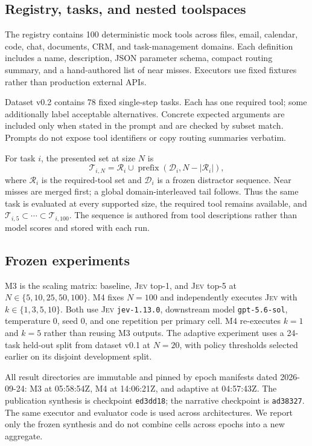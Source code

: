 \documentclass[10pt,twocolumn]{article}
\newcommand{\jev}{\textsc{Jev}}
\begin{document}
\subsection{Registry, tasks, and nested toolspaces}

The registry contains 100 deterministic mock tools across files, email, calendar, code, chat, documents, CRM, and task-management domains. Each definition includes a name, description, JSON parameter schema, compact routing summary, and a hand-authored list of near misses. Executors use fixed fixtures rather than production external APIs.

Dataset v0.2 contains 78 fixed single-step tasks. Each has one required tool; some additionally label acceptable alternatives. Concrete expected arguments are included only when stated in the prompt and are checked by subset match. Prompts do not expose tool identifiers or copy routing summaries verbatim.

For task $i$, the presented set at size $N$ is
\begin{equation}
\mathcal{T}_{i,N}=\mathcal{R}_i \cup
\operatorname{prefix}(\mathcal{D}_i,N-|\mathcal{R}_i|),
\end{equation}
where $\mathcal{R}_i$ is the required-tool set and $\mathcal{D}_i$ is a frozen distractor sequence. Near misses are merged first; a global domain-interleaved tail follows. Thus the same task is evaluated at every supported size, the required tool remains available, and $\mathcal{T}_{i,5}\subset\cdots\subset\mathcal{T}_{i,100}$. The sequence is authored from tool descriptions rather than model scores and stored with each run.

\subsection{Frozen experiments}

M3 is the scaling matrix: baseline, \jev{} top-1, and \jev{} top-5 at $N\in\{5,10,25,50,100\}$. M4 fixes $N=100$ and independently executes \jev{} with $k\in\{1,3,5,10\}$. Both use \jev{} \texttt{jev-1.13.0}, downstream model \texttt{gpt-5.6-sol}, temperature 0, seed 0, and one repetition per primary cell. M4 re-executes $k=1$ and $k=5$ rather than reusing M3 outputs. The adaptive experiment uses a 24-task held-out split from dataset v0.1 at $N=20$, with policy thresholds selected earlier on its disjoint development split.

All result directories are immutable and pinned by epoch manifests dated \mbox{2026-09-24}: M3 at 05:58:54Z, M4 at 14:06:21Z, and adaptive at 04:57:43Z. The publication synthesis is checkpoint \texttt{ed3dd18}; the narrative checkpoint is \texttt{ad38327}. The same executor and evaluator code is used across architectures. We report only the frozen synthesis and do not combine cells across epochs into a new aggregate.
\end{document}
